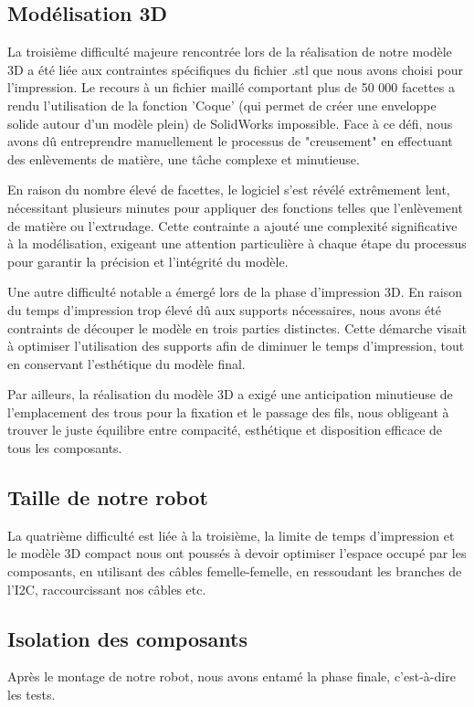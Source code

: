 \subsection{Modélisation 3D}
La troisième difficulté majeure rencontrée lors de la réalisation de notre modèle 3D a été liée aux contraintes spécifiques du fichier .stl que nous avons choisi pour l'impression. Le recours à un fichier maillé comportant plus de 50 000 facettes a rendu l'utilisation de la fonction 'Coque' (qui permet de créer une enveloppe solide autour d'un modèle plein) de SolidWorks impossible. Face à ce défi, nous avons dû entreprendre manuellement le processus de "creusement" en effectuant des enlèvements de matière, une tâche complexe et minutieuse.

En raison du nombre élevé de facettes, le logiciel s'est révélé extrêmement lent, nécessitant plusieurs minutes pour appliquer des fonctions telles que l'enlèvement de matière ou l'extrudage. Cette contrainte a ajouté une complexité significative à la modélisation, exigeant une attention particulière à chaque étape du processus pour garantir la précision et l'intégrité du modèle.

Une autre difficulté notable a émergé lors de la phase d'impression 3D. En raison du temps d'impression trop élevé dû aux supports nécessaires, nous avons été contraints de découper le modèle en trois parties distinctes. Cette démarche visait à optimiser l'utilisation des supports afin de diminuer le temps d'impression, tout en conservant l'esthétique du modèle final.

Par ailleurs, la réalisation du modèle 3D a exigé une anticipation minutieuse de l'emplacement des trous pour la fixation et le passage des fils, nous obligeant à trouver le juste équilibre entre compacité, esthétique et disposition efficace de tous les composants.

\subsection{Taille de notre robot}
La quatrième difficulté est liée à la troisième, la limite de temps d'impression et le modèle 3D compact nous ont poussés à devoir optimiser l'espace occupé par les composants, en utilisant des câbles femelle-femelle, en ressoudant les branches de l'I2C, raccourcissant nos câbles etc.

\subsection{Isolation des composants}
Après le montage de notre robot, nous avons entamé la phase finale, c'est-à-dire les tests.

